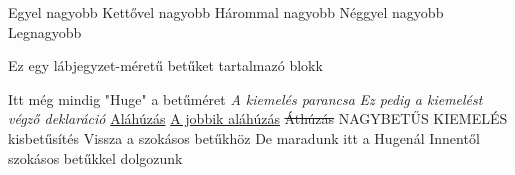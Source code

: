 \documentclass{article}
\begin{document}
            \large Egyel nagyobb
            \Large Kettővel nagyobb
            \LARGE Hárommal nagyobb
            \huge Néggyel nagyobb
            \Huge Legnagyobb
            \begin{footnotesize}
                Ez egy lábjegyzet-méretű betűket tartalmazó blokk
            \end{footnotesize}
            Itt még mindig "Huge" a betűméret
            \emph{A kiemelés parancsa}
            {
                \em
                Ez pedig a kiemelést végző deklaráció
            }
            \underline{Aláhúzás}
            \uline{A jobbik aláhúzás}
            \sout{Áthúzás}
            \MakeUppercase{Nagybetűs kiemelés}
            \MakeLowercase{Kis\-betű\-sí\-tés}
            \textnormal{Vissza a szokásos betűkhöz}
            De maradunk itt a Hugenál
            \normalsize\normalfont Innentől szokásos betűkkel dolgozunk
\end{document}
